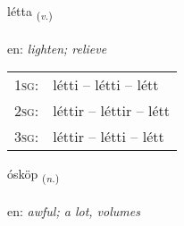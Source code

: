 \documentclass[frontgrid, backgrid]{flacards}\usepackage[]{graphicx}\usepackage[]{xcolor}
\begin{document}
\renewcommand{\flhead}{\vskip5pt \fboxsep=0pt {\small\bfseries\footnotesize Sagnorð | Verb}}
\renewcommand{\fcfoot}{\vskip5pt \fboxsep=0pt \hspace{2pt}{\small\bfseries\footnotesize 3K}}

\renewcommand{\blhead}{\vskip5pt {\small\bfseries\footnotesize Sagnorð | Verb }}
\renewcommand{\bcfoot}{\vskip5pt \hspace{2pt}{\small\bfseries\footnotesize 3K}}


{létta \small{\textsubscript{(\textit{v.})}} \\[1ex] %
\textphonetic{[ljɛhta]} \\
en: \emph{lighten; relieve} \\  [2ex]
\renewcommand*{\arraystretch}{0.8}
\begin{tabular}{p{1cm}l}
\textsc{1sg}: & létti -- létti -- létt \\ 
\textsc{2sg}: & léttir -- léttir -- létt \\ 
\textsc{3sg}: & léttir -- létti -- létt \\ 
\end{tabular}
}

\renewcommand{\flhead}{\vskip5pt \fboxsep=0pt {\small\bfseries\footnotesize Nafnorð | Noun}}
\renewcommand{\fcfoot}{\vskip5pt \fboxsep=0pt \hspace{2pt}{\small\bfseries\footnotesize 3K}}

\renewcommand{\blhead}{\vskip5pt {\small\bfseries\footnotesize Nafnorð | Noun }}
\renewcommand{\bcfoot}{\vskip5pt \hspace{2pt}{\small\bfseries\footnotesize 3K}}


{ósköp \small{\textsubscript{(\textit{n.})}} \\[1ex] %
\textphonetic{[ouːskœp]} \\
en: \emph{awful; a lot, volumes} \\  [2ex]
\renewcommand*{\arraystretch}{0.8}
}
\end{document}
